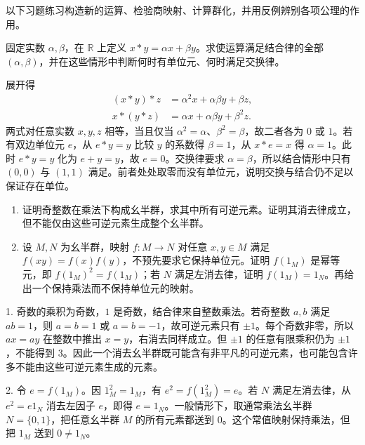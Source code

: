 \BookExercises

以下习题练习构造新的运算、检验商映射、计算群化，并用反例辨别各项公理的作用。

\begin{exercise}\label{b1:ex:01-affine}
	固定实数 \(\alpha,\beta\)，在 \(\mathbb R\) 上定义 \(x*y=\alpha x+\beta y\)。求使运算满足结合律的全部 \((\alpha,\beta)\)，并在这些情形中判断何时有单位元、何时满足交换律。
\end{exercise}
\begin{solution}
	展开得
	\[
		\begin{aligned}
			(x*y)*z&=\alpha^2x+\alpha\beta y+\beta z,\\
			x*(y*z)&=\alpha x+\alpha\beta y+\beta^2z.
		\end{aligned}
	\]
	两式对任意实数 \(x,y,z\) 相等，当且仅当 \(\alpha^2=\alpha\)、\(\beta^2=\beta\)，故二者各为 \(0\) 或 \(1\)。若有双边单位元 \(e\)，从 \(e*y=y\) 比较 \(y\) 的系数得 \(\beta=1\)，从 \(x*e=x\) 得 \(\alpha=1\)。此时 \(e*y=y\) 化为 \(e+y=y\)，故 \(e=0\)。交换律要求 \(\alpha=\beta\)，所以结合情形中只有 \((0,0)\) 与 \((1,1)\) 满足。前者处处取零而没有单位元，说明交换与结合仍不足以保证存在单位。
\end{solution}

\begin{exercise}\label{b1:ex:01-odd}
	\begin{enumerate}
		\item 证明奇整数在乘法下构成幺半群，求其中所有可逆元素。证明其消去律成立，但不能仅由这些可逆元素生成整个幺半群。
		\item 设 \(M,N\) 为幺半群，映射 \(f:M\to N\) 对任意 \(x,y\in M\) 满足 \(f(xy)=f(x)f(y)\)，不预先要求它保持单位元。证明 \(f(1_M)\) 是幂等元，即 \(f(1_M)^2=f(1_M)\)；若 \(N\) 满足左消去律，证明 \(f(1_M)=1_N\)。再给出一个保持乘法而不保持单位元的映射。
	\end{enumerate}
\end{exercise}
\begin{solution}
	1. 奇数的乘积为奇数，\(1\) 是奇数，结合律来自整数乘法。若奇整数 \(a,b\) 满足 \(ab=1\)，则 \(a=b=1\) 或 \(a=b=-1\)，故可逆元素只有 \(\pm1\)。每个奇数非零，所以 \(ax=ay\) 在整数中推出 \(x=y\)，右消去同样成立。但 \(\pm1\) 的任意有限乘积仍为 \(\pm1\)，不能得到 \(3\)。因此一个消去幺半群既可能含有非平凡的可逆元素，也可能包含许多不能由这些可逆元素生成的元素。

	2. 令 \(e=f(1_M)\)。因 \(1_M^2=1_M\)，有 \(e^2=f(1_M^2)=e\)。若 \(N\) 满足左消去律，从 \(e^2=e1_N\) 消去左因子 \(e\)，即得 \(e=1_N\)。一般情形下，取通常乘法幺半群 \(N=\{0,1\}\)，把任意幺半群 \(M\) 的所有元素都送到 \(0\)。这个常值映射保持乘法，但把 \(1_M\) 送到 \(0\ne1_N\)。
\end{solution}

